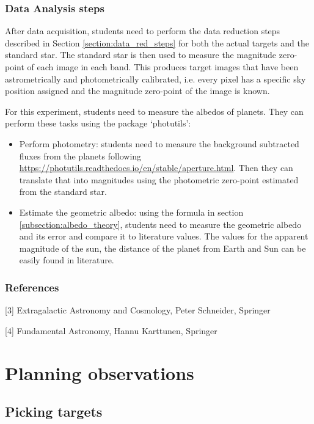 \documentclass[a4paper, 11pt, fleqn]{memoir}
\begin{document}
\subsection{Data Analysis steps}

After data acquisition, students need to perform the data reduction steps described in Section \ref{section:data_red_steps} for both the actual targets and the standard star.
The standard star is then used to measure the magnitude zero-point of each image in each band.
This produces target images that have been astrometrically and photometrically calibrated, i.e. every pixel has a specific sky position assigned and the magnitude zero-point of the image is known.

For this experiment, students need to measure the albedos of planets.
They can perform these tasks using the  package `photutils':
\begin{itemize}
    \item Perform photometry: students need to measure the background subtracted fluxes from the planets following \url{https://photutils.readthedocs.io/en/stable/aperture.html}.
          Then they can translate that into magnitudes using the photometric zero-point estimated from the standard star.
    \item
          Estimate the geometric albedo: using the formula in section
          \ref{subsection:albedo_theory}, students need to measure the geometric albedo
          and its error and compare it to literature values.
          The values for the apparent magnitude of the sun, the distance of the planet from Earth and Sun can be easily found in literature.
\end{itemize}

\subsection{References}

[3] Extragalactic Astronomy and Cosmology, Peter Schneider, Springer

    [4] Fundamental Astronomy, Hannu Karttunen, Springer

\chapter{Planning observations}

\section{Picking targets}
\end{document}
